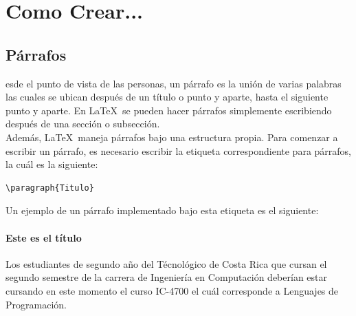 \documentclass[10pt,journal,compsoc]{IEEEtran}
\begin{document}
\section{Como Crear...}


\subsection{P\'arrafos}
esde el punto de vista de las personas, un p\'arrafo es la uni\'on de varias palabras las cuales se ubican despu\'es de un t\'itulo o punto y aparte, hasta el siguiente punto y aparte. En \LaTeX\ se pueden hacer p\'arrafos simplemente escribiendo despu\'es de una secci\'on o subsecci\'on.\\  Adem\'as, \LaTeX\ maneja p\'arrafos bajo una estructura propia. Para comenzar a escribir un p\'arrafo, es necesario escribir la etiqueta correspondiente para p\'arrafos, la cu\'al es la siguiente: 
\begin{lstlisting}
\paragraph{Titulo} 
\end{lstlisting}
Un ejemplo de un p\'arrafo implementado bajo esta etiqueta es el siguiente:
\paragraph{Este es el t\'itulo} 
Los estudiantes de segundo a\~no del T\'ecnol\'ogico de Costa Rica que cursan el segundo semestre de la carrera de Ingenier\'ia en Computaci\'on deber\'ian estar cursando en este momento el curso IC-4700 el cu\'al corresponde a Lenguajes de Programaci\'on.
\end{document}
